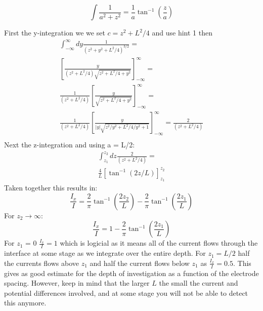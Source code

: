 $$\int \frac{1}{a^2+z^2} = \frac{1}{a}\tan^{-1}(\frac{z}{a})$$
\ifanswers
    \begin{tcolorbox}[enhanced jigsaw,breakable,pad at break*=1mm,
    colback=blue!5!white,colframe=babyblueeyes,title=Solutions,
    watermark color=white]
    First the y-integration we we set $c = z^2 + L^2/4$ and use hint 1 then 
    \begin{eqnarray*}
    \int_{-\infty}^{\infty}dy\frac{1}{(z^2+y^2+L^2/4)^{3/2}} = \\
    \left[  \frac{y}{(z^2 + L^2/4)\sqrt{z^2 + L^2/4 + y^2}}  \right]_{-\infty}^{\infty}  = \\
    \frac{1}{(z^2 + L^2/4)}\left[  \frac{y}{\sqrt{z^2 + L^2/4 + y^2}}  \right]_{-\infty}^{\infty}=\\
    \frac{1}{(z^2 + L^2/4)}\left[  \frac{y}{|y|\sqrt{z^2/y^2 + L^2/4/y^2 + 1}}  \right]_{-\infty}^{\infty}=\frac{2}{(z^2 + L^2/4)}\\
    \end{eqnarray*}
    Next the z-integration and using a = L/2:
    \begin{eqnarray*}
        \int_{z_1}^{z_2}dz \frac{2}{(z^2 + L^2/4)} = \\
        \frac{4}{L}\left[\tan^{-1}(2z/L) \right]_{z_1}^{z_2}
    \end{eqnarray*}
    Taken together this results in:
    $$
    \frac{I_x}{I} = \frac{2}{\pi}\tan^{-1}(\frac{2z_2}{L}) - \frac{2}{\pi}\tan^{-1}(\frac{2z_1}{L})
    $$
    For $z_2\rightarrow \infty$:
    $$
    \frac{I_x}{I} = 1 - \frac{2}{\pi}\tan^{-1}(\frac{2z_1}{L})
    $$
    For $z_1$ = 0 $\frac{I_x}{I} = 1$ which is logicial as it means all of the current flows through the interface at some stage as we integrate over the entire depth. For $z_1 = L/2 $ half the currents flows above $z_1$ and half the current flows below $z_1$ as $\frac{I_x}{I} = 0.5$. This gives as good estimate for the depth of investigation as a function of the electrode spacing. However, keep in mind that the larger $L$ the small the current and potential differences involved, and at some stage you will not be able to detect this anymore. 
    \end{tcolorbox}
\fi

